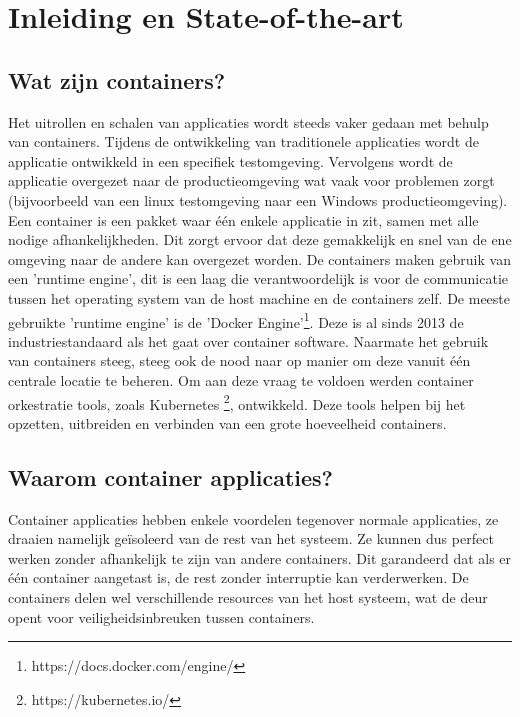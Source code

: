 
\section{Inleiding en State-of-the-art} %
\label{sec:Inleiding en State-of-the-art}

\subsection{Wat zijn containers?}
Het uitrollen en schalen van applicaties wordt steeds vaker gedaan met behulp van containers. 
Tijdens de ontwikkeling van traditionele applicaties wordt de applicatie ontwikkeld in een specifiek testomgeving. 
Vervolgens wordt de applicatie overgezet naar de productieomgeving wat vaak voor problemen zorgt (bijvoorbeeld van een linux testomgeving naar een Windows productieomgeving). 
Een container is een pakket waar één enkele applicatie in zit, samen met alle nodige afhankelijkheden\autocite{Education2019}. 
Dit zorgt ervoor dat deze gemakkelijk en snel van de ene omgeving naar de andere kan overgezet worden. 
De containers maken gebruik van een 'runtime engine', dit is een laag die verantwoordelijk is voor de communicatie tussen het operating system van de host machine en de containers zelf. 
De meeste gebruikte 'runtime engine' is de 'Docker Engine'\footnote{https://docs.docker.com/engine/}. Deze is al sinds 2013 de industriestandaard als het gaat over container software\autocite{McCarty2018}. 
Naarmate het gebruik van containers steeg, steeg ook de nood naar op manier om deze vanuit één centrale locatie te beheren. 
Om aan deze vraag te voldoen werden container orkestratie tools, zoals Kubernetes \footnote{https://kubernetes.io/}, ontwikkeld. 
Deze tools helpen bij het opzetten, uitbreiden en verbinden van een grote hoeveelheid containers. 

\subsection{Waarom container applicaties?}
Container applicaties hebben enkele voordelen tegenover normale applicaties, ze draaien namelijk geïsoleerd van de rest van het systeem. 
Ze kunnen dus perfect werken zonder afhankelijk te zijn van andere containers. 
Dit garandeerd dat als er één container aangetast is, de rest zonder interruptie kan verderwerken. 
De containers delen wel verschillende resources van het host systeem, wat de deur opent voor veiligheidsinbreuken tussen containers. 

